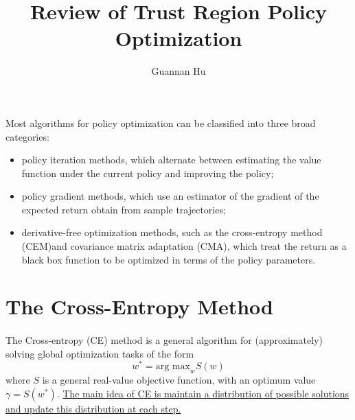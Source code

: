 \documentclass[12pt,a4paper]{article}
\begin{document}
\title{Review of Trust Region Policy Optimization}
\author{Guannan Hu}
\maketitle
\fi
\paragraph{} Most algorithms for policy optimization can be classified into three broad categories:
\begin{itemize}
	\item policy iteration methods, which alternate between estimating the value function under the current policy and improving the policy;
	\item policy gradient methods, which use an estimator of the gradient of the expected return obtain from sample trajectories;
	\item derivative-free optimization methods, such as the cross-entropy method (CEM)and covariance matrix adaptation (CMA), which treat the return as a black box function to be optimized in terms of the policy parameters.
\end{itemize} 

\section{The Cross-Entropy Method}
\paragraph{}The Cross-entropy (CE) \cite{Szita2006Learning} method is a general algorithm for (approximately) solving global optimization tasks of the form 
\begin{equation}
w^{*} = \text{arg max}_{w}S(w)
\end{equation}
where $S$ is a general real-value objective function, with an optimum value $\gamma = S(w^{*})$. \uline{The main idea of CE is maintain a distribution of possible solutions and update this distribution at each step.}
\end{document}
